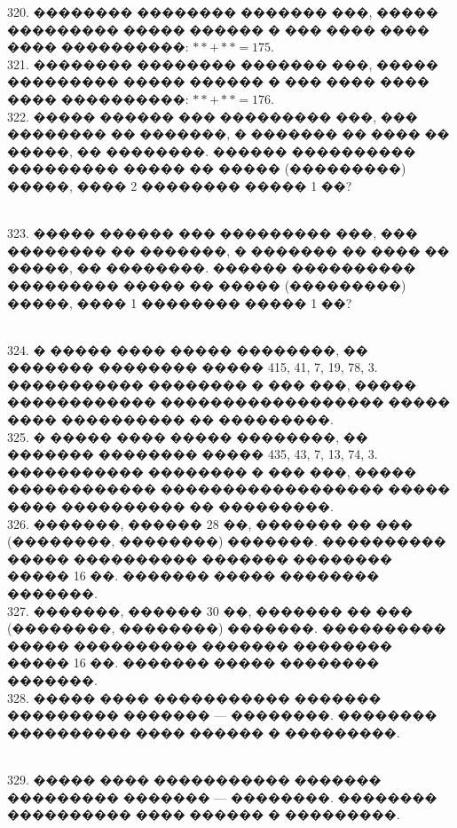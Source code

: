 \documentclass[12pt]{article}
\begin{document}
320. �������� �������� ������� ���, ����� ��������� ����� ������ � ��� ���� ���� ���� ����������: $**+**=175.$\\
321. �������� �������� ������� ���, ����� ��������� ����� ������ � ��� ���� ���� ���� ����������: $**+**=176.$\\
322. ����� ������ ��� ��������� ���, ��� �������� �� �������, � ������� �� ���� �� �����, �� ��������. ������ ���������� ��������� ����� �� ����� (���������) �����, ���� 2 �������� ����� 1 ��?\\
\begin{figure}[ht!]
\end{figure}\\
323. ����� ������ ��� ��������� ���, ��� �������� �� �������, � ������� �� ���� �� �����, �� ��������. ������ ���������� ��������� ����� �� ����� (���������) �����, ���� 1 �������� ����� 1 ��?\\
\begin{figure}[ht!]
\end{figure}\\
324. � ����� ���� ����� ��������, �� ������� �������� ����� 415, 41, 7, 19, 78, 3. ����������� �������� � ��� ���, ����� ������������ ������������������ ����� ���� ���������� �� ���������.\\
325. � ����� ���� ����� ��������, �� ������� �������� ����� 435, 43, 7, 13, 74, 3. ����������� �������� � ��� ���, ����� ������������ ������������������ ����� ���� ���������� �� ���������.\\
326. �������, ������ 28 ��, ������� �� ��� (��������, ��������) �������. ���������� ����� ���������� ������� �������� ����� 16 ��. ������� ����� �������� �������.\\
327. �������, ������ 30 ��, ������� �� ��� (��������, ��������) �������. ���������� ����� ���������� ������� �������� ����� 16 ��. ������� ����� �������� �������.\\
328. ����� ���� ����������� ������� ��������� ������� --- ��������. �������� ���������� ���� ������ �
���������.\\
\begin{figure}[ht!]
\end{figure}\\
329. ����� ���� ����������� ������� ��������� ������� --- ��������. �������� ���������� ���� ������ �
���������.\\
\begin{figure}[ht!]
\end{figure}\\
\end{document}

